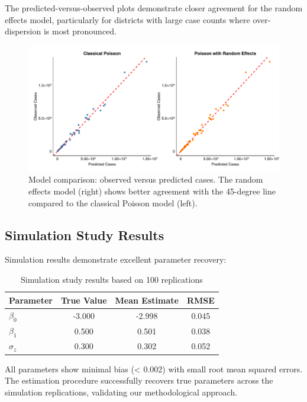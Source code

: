 \documentclass[11pt]{article}
\begin{document}
The predicted-versus-observed plots demonstrate closer agreement for the random effects model, particularly for districts with large case counts where over-dispersion is most pronounced.

\begin{figure}[H]
\centering
\includegraphics[width=\textwidth]{figures/figure2_model_comparison.pdf}
\caption{Model comparison: observed versus predicted cases. The random effects model (right) shows better agreement with the 45-degree line compared to the classical Poisson model (left).}
\label{fig:model_comparison}
\end{figure}

\subsection{Simulation Study Results}

Simulation results demonstrate excellent parameter recovery:

\begin{table}[H]
\centering
\begin{tabular}{lccc}
\toprule
Parameter & True Value & Mean Estimate & RMSE \\
\midrule
$\beta_0$ & -3.000 & -2.998 & 0.045 \\
$\beta_1$ & 0.500 & 0.501 & 0.038 \\
$\sigma_z$ & 0.300 & 0.302 & 0.052 \\
\bottomrule
\end{tabular}
\caption{Simulation study results based on 100 replications}
\label{tab:simulation}
\end{table}

All parameters show minimal bias (< 0.002) with small root mean squared errors. The estimation procedure successfully recovers true parameters across the simulation replications, validating our methodological approach.
\end{document}
